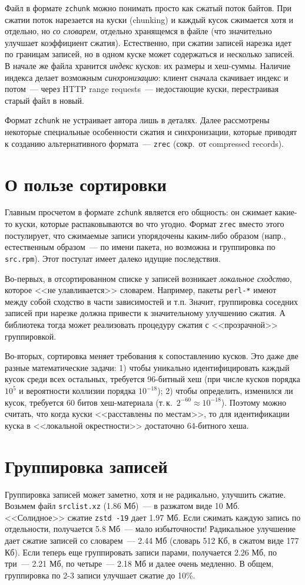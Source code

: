 \documentclass[russian,a4paper,12pt]{article}
\begin{document}
Файл в формате \verb|zchunk| можно понимать просто как сжатый поток байтов.  При сжатии поток нарезается на куски (chunking)
и каждый кусок сжимается хотя и отдельно, но \textit{со словарем}, отдельно хранящемся в файле (что значительно улучшает
коэффициент сжатия).  Естественно, при сжатии записей нарезка идет по границам записей, но в одном куске может содержаться
и несколько записей.  В начале же файла хранится \textit{индекс} кусков: их размеры и хеш-суммы.  Наличие индекса делает
возможным \textit{синхронизацию}: клиент сначала скачивает индекс и потом~--- через HTTP range requests~--- недостающие
куски, перестраивая старый файл в новый.

Формат \verb|zchunk| не устраивает автора лишь в деталях.  Далее рассмотрены некоторые специальные особенности сжатия
и синхронизации, которые приводят к созданию альтернативного формата~--- \verb|zrec| (сокр.~от compressed records).

\section{О пользе сортировки}
Главным просчетом в формате \verb|zchunk| является его общность: он сжимает какие-то куски, которые распаковываются
во что угодно.  Формат \verb|zrec| вместо этого постулирует, что сжимаемые записи упорядочены каким-либо образом (напр.,
естественным образом~--- по имени пакета, но возможна и группировка по \verb|src.rpm|).  Этот постулат имеет далеко
идущие последствия.

Во-первых, в отсортированном списке у записей возникает \textit{локальное сходство}, которое <<не улавливается>> словарем.
Например, пакеты \verb|perl-*| имеют между собой сходство в части зависимостей и т.п.  Значит, группировка соседних
записей при нарезке должна привести к значительному улучшению сжатия.  А библиотека тогда может реализовать
процедуру сжатия с <<прозрачной>> группировкой.

Во-вторых, сортировка меняет требования к сопоставлению кусков.  Это даже две разные математические задачи:
1) чтобы уникально идентифицировать каждый кусок среди всех остальных, требуется 96-битный хеш (при числе кусков порядка $10^5$
и вероятности коллизии порядка $10^{-18}$); 2) чтобы определить, изменился ли кусок, требуется 60 битов хеш-материала
(т.\,к.~$2^{-60}\approx10^{-18}$).  Поэтому можно считать, что когда куски <<расставлены по местам>>, то для идентификации
куска в <<локальной окрестности>> достаточно 64-битного хеша.

\section{Группировка записей}
Группировка записей может заметно, хотя и не радикально, улучшить сжатие.  Возьмем файл \verb|srclist.xz| (1.86 Мб)~--- в разжатом
виде 10 Мб.  <<Солидное>> сжатие \verb|zstd -19| дает 1.97 Мб.  Если сжимать каждую запись по отдельности, получается 5.8 Мб~---
мало избыточности!  Радикальное улучшение дает сжатие записей со словарем~--- 2.44 Мб (словарь 512 Кб, в сжатом виде 177 Кб).
Если теперь еще группировать записи парами, получается 2.26 Мб, по три~--- 2.21 Мб, по четыре~--- 2.18 Мб и далее очень медленно.
В общем, группировка по 2-3 записи улучшает сжатие до 10\%.
\end{document}
